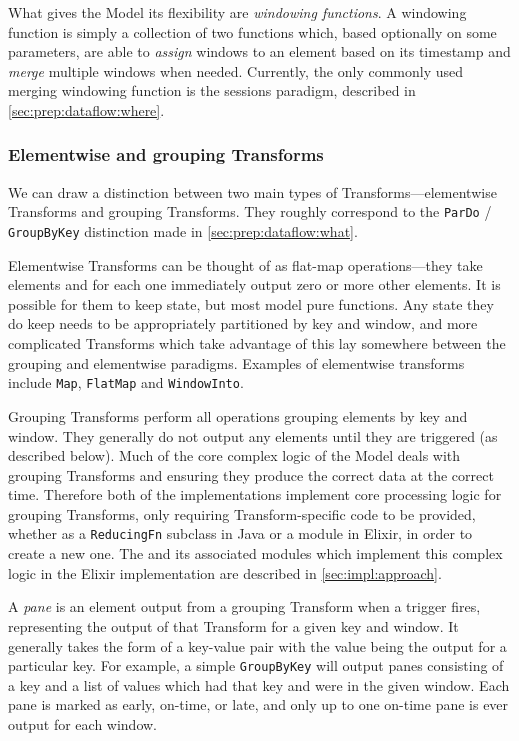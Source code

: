 What gives the Model its flexibility are \emph{windowing functions}.
A windowing function is simply a collection of two functions which, based optionally on some parameters, are able to \emph{assign} windows to an element based on its timestamp and \emph{merge} multiple windows when needed.
Currently, the only commonly used merging windowing function is the sessions paradigm, described in \cref{sec:prep:dataflow:where}.

\subsubsection{Elementwise and grouping Transforms}

We can draw a distinction between two main types of Transforms---elementwise Transforms and grouping Transforms.
They roughly correspond to the \verb|ParDo| / \verb|GroupByKey| distinction made in \cref{sec:prep:dataflow:what}.

Elementwise Transforms can be thought of as flat-map operations---they take elements and for each one immediately output zero or more other elements.
It is possible for them to keep state, but most model pure functions.
Any state they do keep needs to be appropriately partitioned by key and window, and more complicated Transforms which take advantage of this lay somewhere between the grouping and elementwise paradigms.
Examples of elementwise transforms include \verb|Map|, \verb|FlatMap| and \verb|WindowInto|.

Grouping Transforms perform all operations grouping elements by key and window.
They generally do not output any elements until they are triggered (as described below).
Much of the core complex logic of the Model deals with grouping Transforms and ensuring they produce the correct data at the correct time.
Therefore both of the implementations implement core processing logic for grouping Transforms, only requiring Transform-specific code to be provided, whether as a \verb|ReducingFn| subclass in Java or a  module in Elixir, in order to create a new one.
The  and its associated modules which implement this complex logic in the Elixir implementation are described in \cref{sec:impl:approach}.


A \emph{pane} is an element output from a grouping Transform when a trigger fires, representing the output of that Transform for a given key and window.
It generally takes the form of a key-value pair with the value being the output for a particular key.
For example, a simple \verb|GroupByKey| will output panes consisting of a key and a list of values which had that key and were in the given window.
Each pane is marked as early, on-time, or late, and only up to one on-time pane is ever output for each window.

